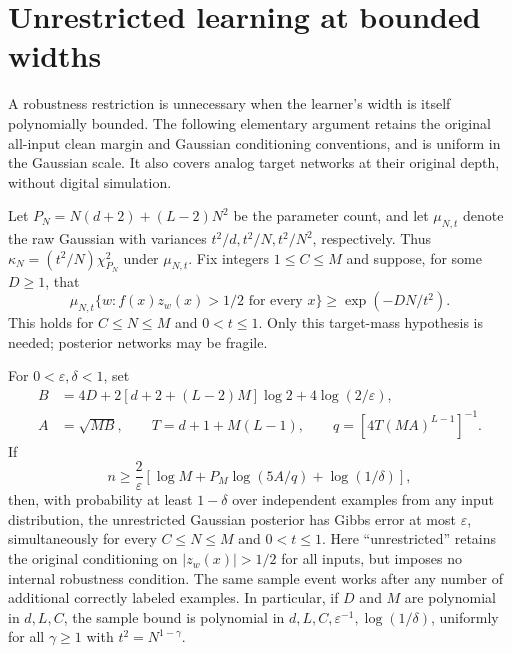 \section{Unrestricted learning at bounded widths}
\label{sec:finitewidth-unrestricted}

A robustness restriction is unnecessary when the learner's width is itself
polynomially bounded. The following elementary argument retains the original
all-input clean margin and Gaussian conditioning conventions, and is uniform
in the Gaussian scale. It also covers analog target networks at their original
depth, without digital simulation.

Let $P_N=N(d+2)+(L-2)N^2$ be the parameter count, and let $\mu_{N,t}$ denote
the raw Gaussian with variances $t^2/d,t^2/N,t^2/N^2$, respectively. Thus
$\kappa_N=(t^2/N)\chi^2_{P_N}$ under $\mu_{N,t}$. Fix integers
$1\le C\le M$ and suppose, for some $D\ge1$, that
\begin{equation}\label{eq:finitewidth-targetmass}
 \mu_{N,t}\{w:f(x)z_w(x)>1/2\text{ for every }x\}
 \ge \exp(-DN/t^2).
\end{equation}
This holds for $C\le N\le M$ and $0<t\le1$. Only this target-mass
hypothesis is needed; posterior networks may be fragile.

\begin{theorem}\label{thm:finitewidth-unrestricted}
For $0<\varepsilon,\delta<1$, set
\begin{align*}
 B&=4D+2[d+2+(L-2)M]\log2+4\log(2/\varepsilon),\\
 A&=\sqrt{MB},\qquad T=d+1+M(L-1),\qquad
 q=[4T(MA)^{L-1}]^{-1}.
\end{align*}
If
\[
 n\ge\frac2\varepsilon\left[
 \log M+P_M\log(5A/q)+\log(1/\delta)\right],
\]
then, with probability at least $1-\delta$ over independent examples from any
input distribution, the unrestricted Gaussian posterior has Gibbs error at
most $\varepsilon$, simultaneously for every $C\le N\le M$ and $0<t\le1$.
Here ``unrestricted'' retains the original conditioning on
$|z_w(x)|>1/2$ for all inputs, but imposes no internal robustness condition.
The same sample event works after any number of additional correctly labeled
examples. In particular, if $D$ and $M$ are polynomial in $d,L,C$, the sample
bound is polynomial in $d,L,C,\varepsilon^{-1},\log(1/\delta)$, uniformly for
all $\gamma\ge1$ with $t^2=N^{1-\gamma}$.
\end{theorem}

